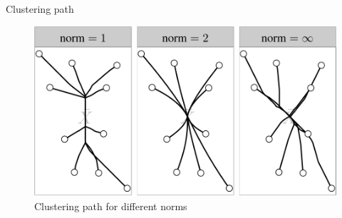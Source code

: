 \documentclass[11pt]{beamer}
\begin{document}
\begin{frame}{Clustering path}
\begin{figure}
	\centering
	\includegraphics[scale=0.5]{images/clusterpath-Hocking.png}
	\caption{Clustering path for different norms \citep{Hocking2011}}
\end{figure}
\end{frame}


\end{document}
